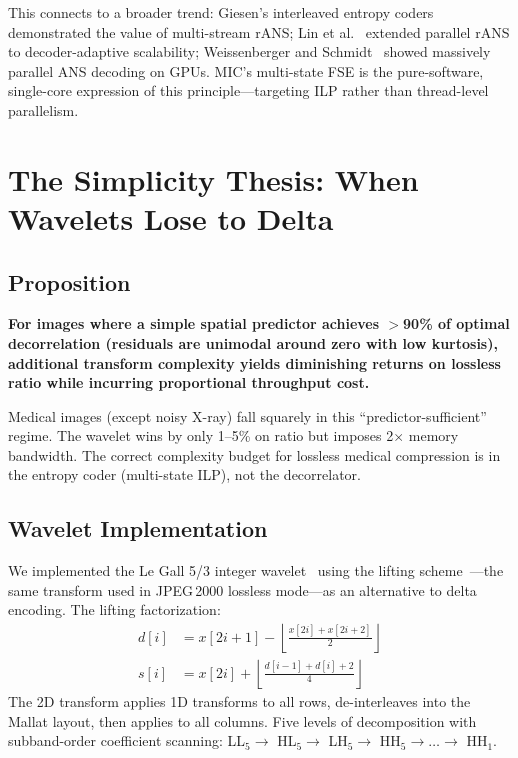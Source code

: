 \documentclass[10pt,twocolumn]{article}
\begin{document}
This connects to a broader trend: Giesen's interleaved entropy coders~\cite{giesen2014,giesen2014rans} demonstrated the value of multi-stream rANS; Lin et al.~\cite{lin2023recoil} extended parallel rANS to decoder-adaptive scalability; Weissenberger and Schmidt~\cite{weissenberger2019} showed massively parallel ANS decoding on GPUs. MIC's multi-state FSE is the pure-software, single-core expression of this principle---targeting ILP rather than thread-level parallelism.

\section{The Simplicity Thesis: When Wavelets Lose to Delta}
\label{sec:simplicity}

\subsection{Proposition}

\textbf{For images where a simple spatial predictor achieves $>$90\% of optimal decorrelation (residuals are unimodal around zero with low kurtosis), additional transform complexity yields diminishing returns on lossless ratio while incurring proportional throughput cost.}

Medical images (except noisy X-ray) fall squarely in this ``predictor-sufficient'' regime. The wavelet wins by only 1--5\% on ratio but imposes 2$\times$ memory bandwidth. The correct complexity budget for lossless medical compression is in the entropy coder (multi-state ILP), not the decorrelator.

\subsection{Wavelet Implementation}

We implemented the Le Gall 5/3 integer wavelet~\cite{legall1988} using the lifting scheme~\cite{sweldens1996,daubechies1998}---the same transform used in JPEG\,2000 lossless mode---as an alternative to delta encoding. The lifting factorization:
\begin{align}
  d[i] &= x[2i+1] - \left\lfloor\frac{x[2i] + x[2i+2]}{2}\right\rfloor \\
  s[i] &= x[2i] + \left\lfloor\frac{d[i-1] + d[i] + 2}{4}\right\rfloor
\end{align}
The 2D transform applies 1D transforms to all rows, de-interleaves into the Mallat layout, then applies to all columns. Five levels of decomposition with subband-order coefficient scanning: LL$_5 \to$ HL$_5 \to$ LH$_5 \to$ HH$_5 \to \ldots \to$ HH$_1$.
\end{document}
